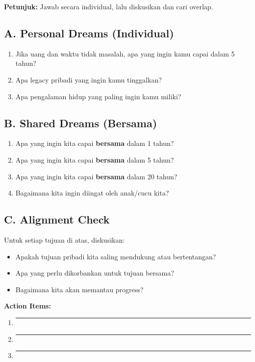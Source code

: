 \begin{exercisebox}
\textbf{Petunjuk:} Jawab secara individual, lalu diskusikan dan cari overlap.

\subsection*{A. Personal Dreams (Individual)}
\begin{enumerate}
    \item Jika uang dan waktu tidak masalah, apa yang ingin kamu capai dalam 5 tahun?
    \item Apa legacy pribadi yang ingin kamu tinggalkan?
    \item Apa pengalaman hidup yang paling ingin kamu miliki?
\end{enumerate}

\subsection*{B. Shared Dreams (Bersama)}
\begin{enumerate}
    \item[4.] Apa yang ingin kita capai \textbf{bersama} dalam 1 tahun?
    \item[5.] Apa yang ingin kita capai \textbf{bersama} dalam 5 tahun?
    \item[6.] Apa yang ingin kita capai \textbf{bersama} dalam 20 tahun?
    \item[7.] Bagaimana kita ingin diingat oleh anak/cucu kita?
\end{enumerate}

\subsection*{C. Alignment Check}
Untuk setiap tujuan di atas, diskusikan:
\begin{itemize}
    \item Apakah tujuan pribadi kita saling mendukung atau bertentangan?
    \item Apa yang perlu dikorbankan untuk tujuan bersama?
    \item Bagaimana kita akan memantau progress?
\end{itemize}

\textbf{Action Items:}
\begin{enumerate}
    \item \rule{12cm}{0.4pt}
    \item \rule{12cm}{0.4pt}
    \item \rule{12cm}{0.4pt}
\end{enumerate}
\end{exercisebox}

